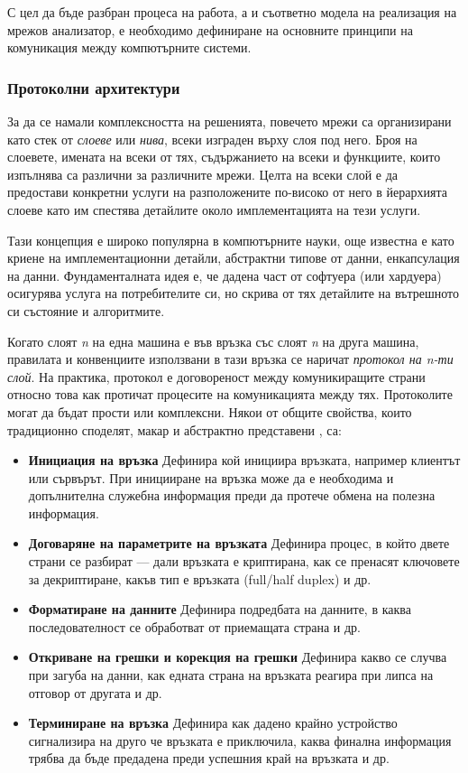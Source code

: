 \documentclass[12pt,a4paper,oneside]{book}
\begin{document}
С цел да бъде разбран процеса на работа, а и съответно модела на реализация на
мрежов анализатор, е необходимо дефиниране на основните принципи на
комуникация между компютърните системи.

\subsubsection{Протоколни архитектури}

За да се намали комплексността на решенията, повечето мрежи са организирани като
стек от \textit{слоеве} или \textit{нива}, всеки изграден върху слоя под него.
Броя на слоевете, имената на всеки от тях, съдържанието на всеки и функциите,
които изпълнява са различни за различните мрежи. Целта на всеки слой е да
предостави конкретни услуги на разположените по-високо от него в йерархията
слоеве като им спестява детайлите около имплементацията на тези услуги.

Тази концепция е широко популярна в компютърните науки, още известна е като
криене на имплементационни детайли, абстрактни типове от данни, енкапсулация на
данни. Фундаменталната идея е, че дадена част от софтуера (или хардуера)
осигурява услуга на потребителите си, но скрива от тях детайлите на вътрешното
си състояние и алгоритмите.

Когато слоят \textit{n} на една машина е във връзка със слоят \textit{n} на
друга машина, правилата и конвенциите използвани в тази връзка се наричат
\textit{протокол на n-ти слой}. На практика, протокол е договореност
между комуникиращите страни относно това как протичат процесите на
комуникацията между тях. \cite{tanenbaum_computer_2011} Протоколите могат да
бъдат прости или комплексни. Някои от общите
свойства, които традиционно споделят, макар и абстрактно представени
\cite{sanders_practical_2011}, са:

\begin{itemize}
  \item \textbf{Инициация на връзка} Дефинира кой инициира връзката, например
    клиентът или сървърът. При иницииране на връзка може да е необходима и
    допълнителна служебна информация преди да протече обмена на полезна
    информация.
  \item \textbf{Договаряне на параметрите на връзката} Дефинира процес, в който
    двете страни се разбират --- дали връзката е криптирана, как се пренасят
    ключовете за декриптиране, какъв тип е връзката (full/half duplex) и др.
  \item \textbf{Форматиране на данните} Дефинира подредбата на данните, в каква
    последователност се обработват от приемащата страна и др.
  \item \textbf{Откриване на грешки и корекция на грешки} Дефинира какво се
    случва при загуба на данни, как едната страна на връзката реагира при липса
    на отговор от другата и др.
  \item \textbf{Терминиране на връзка} Дефинира как дадено крайно устройство
    сигнализира на друго че връзката е приключила, каква финална информация
    трябва да бъде предадена преди успешния край на връзката и др.
\end{itemize}
\end{document}
